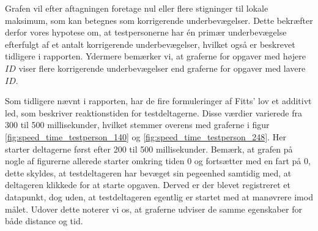 Grafen vil efter aftagningen foretage nul eller flere stigninger til lokale maksimum, som kan betegnes som korrigerende underbevægelser. Dette bekræfter derfor vores hypotese om, at testpersonerne har én primær underbevægelse efterfulgt af et antalt korrigerende underbevægelser, hvilket også er beskrevet tidligere i rapporten. Ydermere bemærker vi, at graferne for opgaver med højere $ID$ viser flere korrigerende underbevægelser end graferne for opgaver med lavere $ID$.

Som tidligere nævnt i rapporten, har de fire formuleringer af Fitts' lov et additivt led, som beskriver reaktionstiden for testdeltagerne. Disse værdier varierede fra 300 til 500 millisekunder, hvilket stemmer overens med graferne i figur \ref{fig:speed_time_testperson_140} og \ref{fig:speed_time_testperson_248}. Her starter deltagerne først efter 200 til 500 millisekunder. Bemærk, at grafen på nogle af figurerne allerede starter omkring tiden 0 og fortsætter med en fart på 0, dette skyldes, at testdeltageren har bevæget sin pegeenhed samtidig med, at deltageren klikkede for at starte opgaven. Derved er der blevet registreret et datapunkt, dog uden, at testdeltageren egentlig er startet med at manøvrere imod målet. Udover dette noterer vi os, at graferne udviser de samme egenskaber for både distance og tid.\\\\
